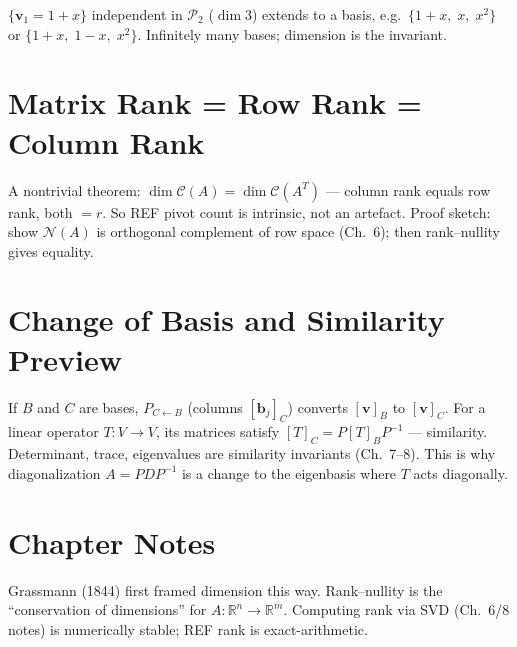 \begin{example}
$\{\mathbf{v}_1=1+x\}$ independent in $\mathcal{P}_2$ ($\dim3$) extends to a basis, e.g.\ $\{1+x,\;x,\;x^2\}$ or $\{1+x,\;1-x,\;x^2\}$. Infinitely many bases; dimension is the invariant.
\end{example}

\section{Matrix Rank = Row Rank = Column Rank}
\label{sec:rank-equal}
A nontrivial theorem: $\dim\mathcal{C}(A)=\dim\mathcal{C}(A^T)$ --- column rank equals row rank, both $=r$. So REF pivot count is intrinsic, not an artefact. Proof sketch: show $\mathcal{N}(A)$ is orthogonal complement of row space (Ch.~6); then rank--nullity gives equality.

\section{Change of Basis and Similarity Preview}
\label{sec:change-basis-detail}
If $B$ and $C$ are bases, $P_{C\gets B}$ (columns $[\mathbf{b}_j]_C$) converts $[\mathbf{v}]_B$ to $[\mathbf{v}]_C$. For a linear operator $T:V\to V$, its matrices satisfy $[T]_C=P[T]_BP^{-1}$ --- similarity. Determinant, trace, eigenvalues are similarity invariants (Ch.~7--8). This is why diagonalization $A=PDP^{-1}$ is a change to the eigenbasis where $T$ acts diagonally.


\section{Chapter Notes}
Grassmann (1844) first framed dimension this way. Rank--nullity is the ``conservation of dimensions'' for $A:\mathbb{R}^n\to\mathbb{R}^m$. Computing rank via SVD (Ch.~6/8 notes) is numerically stable; REF rank is exact-arithmetic.

